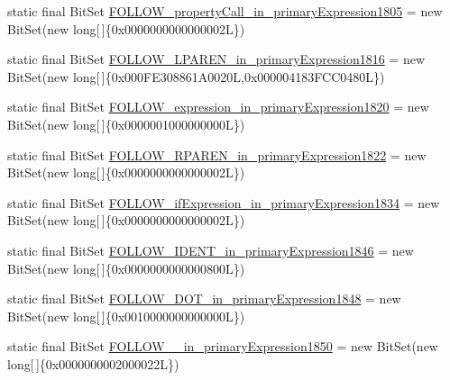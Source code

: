 \begin{DoxyCompactItemize}
\item 
static final Bit\-Set \hyperlink{classorg_1_1tzi_1_1use_1_1parser_1_1testsuite_1_1_test_suite_parser_a01965951443a85d27e97316a7ca0e7e3}{F\-O\-L\-L\-O\-W\-\_\-property\-Call\-\_\-in\-\_\-primary\-Expression1805} = new Bit\-Set(new long\mbox{[}$\,$\mbox{]}\{0x0000000000000002\-L\})
\item 
static final Bit\-Set \hyperlink{classorg_1_1tzi_1_1use_1_1parser_1_1testsuite_1_1_test_suite_parser_ad82c5cb105cc949258f54f6fad637b33}{F\-O\-L\-L\-O\-W\-\_\-\-L\-P\-A\-R\-E\-N\-\_\-in\-\_\-primary\-Expression1816} = new Bit\-Set(new long\mbox{[}$\,$\mbox{]}\{0x000\-F\-E308861\-A0020\-L,0x000004183\-F\-C\-C0480\-L\})
\item 
static final Bit\-Set \hyperlink{classorg_1_1tzi_1_1use_1_1parser_1_1testsuite_1_1_test_suite_parser_a3bd052323456867271e7ed318d9b8829}{F\-O\-L\-L\-O\-W\-\_\-expression\-\_\-in\-\_\-primary\-Expression1820} = new Bit\-Set(new long\mbox{[}$\,$\mbox{]}\{0x0000001000000000\-L\})
\item 
static final Bit\-Set \hyperlink{classorg_1_1tzi_1_1use_1_1parser_1_1testsuite_1_1_test_suite_parser_a022ebdf88badadcab264d70c66fb81c4}{F\-O\-L\-L\-O\-W\-\_\-\-R\-P\-A\-R\-E\-N\-\_\-in\-\_\-primary\-Expression1822} = new Bit\-Set(new long\mbox{[}$\,$\mbox{]}\{0x0000000000000002\-L\})
\item 
static final Bit\-Set \hyperlink{classorg_1_1tzi_1_1use_1_1parser_1_1testsuite_1_1_test_suite_parser_a1963917f0be485f495777141649ba812}{F\-O\-L\-L\-O\-W\-\_\-if\-Expression\-\_\-in\-\_\-primary\-Expression1834} = new Bit\-Set(new long\mbox{[}$\,$\mbox{]}\{0x0000000000000002\-L\})
\item 
static final Bit\-Set \hyperlink{classorg_1_1tzi_1_1use_1_1parser_1_1testsuite_1_1_test_suite_parser_aad740221079a3f5ff1c089fb3a1a4ea5}{F\-O\-L\-L\-O\-W\-\_\-\-I\-D\-E\-N\-T\-\_\-in\-\_\-primary\-Expression1846} = new Bit\-Set(new long\mbox{[}$\,$\mbox{]}\{0x0000000000000800\-L\})
\item 
static final Bit\-Set \hyperlink{classorg_1_1tzi_1_1use_1_1parser_1_1testsuite_1_1_test_suite_parser_ad2bf989a8b485e77ac90e998816b8aef}{F\-O\-L\-L\-O\-W\-\_\-\-D\-O\-T\-\_\-in\-\_\-primary\-Expression1848} = new Bit\-Set(new long\mbox{[}$\,$\mbox{]}\{0x0010000000000000\-L\})
\item 
static final Bit\-Set \hyperlink{classorg_1_1tzi_1_1use_1_1parser_1_1testsuite_1_1_test_suite_parser_aa1c823e792770b7c315e6b583e527419}{F\-O\-L\-L\-O\-W\-\_\-\_\-in\-\_\-primary\-Expression1850} = new Bit\-Set(new long\mbox{[}$\,$\mbox{]}\{0x0000000002000022\-L\})

\end{DoxyCompactItemize}

